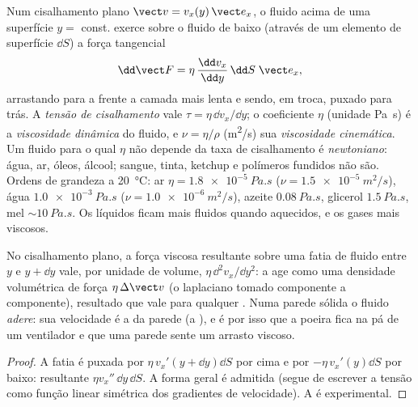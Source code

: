 \begin{definition}\label{def:b2:viscous-flows:viscosity}
Num cisalhamento plano $\vect v = v_x(y)\,\vect e_x$, o fluido acima de uma
superfície $y = $ const. exerce sobre o fluido de baixo (através de um elemento
de superfície $\dd S$) a força tangencial
\[
\dd\vect F = \eta\,\frac{\dd v_x}{\dd y}\,\dd S\;\vect e_x ,
\]
arrastando para a frente a camada mais lenta e sendo, em troca, puxado para trás.
A \emph{tensão de cisalhamento} vale $\tau = \eta\,\dd v_x/\dd y$; o coeficiente
$\eta$ (unidade \unit{Pa.s}) é a \emph{viscosidade dinâmica} do fluido,
e $\nu = \eta/\rho$ (\unit{m^2/s}) sua \emph{viscosidade cinemática}. Um fluido
para o qual $\eta$ não depende da taxa de cisalhamento é \emph{newtoniano}:
água, ar, óleos, álcool; sangue, tinta, ketchup e polímeros fundidos não
são. Ordens de grandeza a \qty{20}{\degreeCelsius}: ar $\eta =
\qty{1.8e-5}{Pa.s}$ ($\nu = \qty{1.5e-5}{m^2/s}$), água $\qty{1.0e-3}{Pa.s}$
($\nu = \qty{1.0e-6}{m^2/s}$), azeite $\qty{0.08}{Pa.s}$, glicerol
$\qty{1.5}{Pa.s}$, mel $\sim\qty{10}{Pa.s}$. Os líquidos ficam mais fluidos quando
aquecidos, e os gases mais viscosos.
\end{definition}

\begin{proposition}\label{prop:b2:viscous-flows:density}
No cisalhamento plano, a força viscosa resultante sobre uma fatia de fluido
entre $y$ e $y + \dd y$ vale, por unidade de volume, $\eta\,\dd^2v_x/\dd y^2$:
a  age como uma densidade volumétrica de força $\eta\,\Delta\vect v$ (o
laplaciano tomado componente a componente), resultado que vale para qualquer
. Numa parede sólida o fluido \emph{adere}: sua
velocidade é a da parede (a \emph{}), e é por isso que
a poeira fica na pá de um ventilador e que uma parede sente um arrasto viscoso.
\end{proposition}

\begin{proof}
A fatia é puxada por $\eta\,v_x'(y + \dd y)\dd S$ por cima e por
$-\eta\,v_x'(y)\dd S$ por baixo: resultante $\eta v_x''\,\dd y\,\dd S$. A forma
geral é admitida (segue de escrever a tensão como função linear
simétrica dos gradientes de velocidade). A  é
experimental.
\end{proof}

